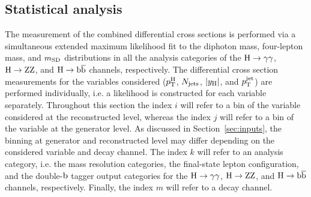 \subsection{Statistical analysis}
\label{sec:stat}

The measurement of the combined differential cross sections is performed via a simultaneous extended maximum likelihood fit to the diphoton mass, four-lepton mass, and $m_\mathrm{SD}$ distributions in all the analysis categories of the $\mathrm{H}\to\mathrm{\gamma}\mathrm{\gamma}$, $\mathrm{H}\to\mathrm{Z}\mathrm{Z}$, and $\mathrm{H}\to\mathrm{b}\overline{\mathrm{b}}$ channels, respectively.
% 
The differential cross section measurements for the variables considered ($p_\mathrm{T}^\mathrm{H}$, $N_\text{jets} $, $\left|y_\mathrm{H}\right| $, and $p_\mathrm{T}^\text{jet} $) are performed individually, i.e. a likelihood is constructed for each variable separately.
% 
Throughout this section the index $i$ will refer to a bin of the variable considered at the reconstructed level, whereas the index $j$ will refer to a bin of the variable at the generator level.
% 
As discussed in Section~\ref{sec:inputs}, the binning at generator and reconstructed level may differ depending on the considered variable and decay channel.
% 
The index $k$ will refer to an analysis category, i.e. the mass resolution categories, the final-state lepton configuration, and the double-$\mathrm{b}$ tagger output categories for the $\mathrm{H}\to\mathrm{\gamma}\mathrm{\gamma}$, $\mathrm{H}\to\mathrm{Z}\mathrm{Z}$, and $\mathrm{H}\to\mathrm{b}\overline{\mathrm{b}}$ channels, respectively.
% 
Finally, the index $m$ will refer to a decay channel.


